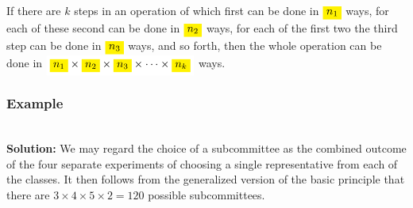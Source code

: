 \documentclass[compress]{beamer}
\newcommand{\sqBullet}[1]{  {\tiny \tiny \tiny \qBoxCol{#1!60}{ }} }
\begin{document}
\begin{frame}
\begin{defn}
If there are $k$ steps in an operation of which first can be done in $\HLTY{n_1}$ ways,
for each of these second can be done in $\HLTY{n_2}$ ways, for each of
the first two the third step can be done in $\HLTY{n_3}$ ways, and so
forth, then the whole operation can be done in
$\HLTW{\HLTY{n_1} \times \HLTY{n_2} \times \HLTY{ n_3} \times \cdots  \times  \HLTY{n_k}}$ ways.
\end{defn}	
	\vspace{.5in}
	
%	
	
	\vspace{2in}
\end{frame}




\begin{frame}
	\frametitle{Example }
	
	
\\
\pause
\vspace{1.2in}
{\tiny {\bf Solution:} We may regard the choice of a subcommittee as the combined outcome of the four separate
experiments of choosing a single representative from each of the classes. It then follows from the generalized version of the basic principle that there are $3\times 4\times 5\times 2 = 120$ possible subcommittees.}
\vspace{2in}

\end{frame}
\end{document}
